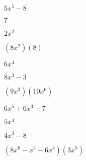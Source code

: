 \documentclass{article}
\begin{document}
\begin{multicols}{2}
 $5x^{5}-8$\item $7$\item $2x^2$\item $(8x^2)(8)$\item $6x^{4}$\item $8x^{3}-3$\item $(9x^{3})(10x^{6})$\item $6x^{5}+6x^{3}-7$\item $5x^{4}$\item $4x^{3}-8$\item $(8x^{6}-x^{5}-6x^{4})(3x^{5})$\
\end{multicols}
\end{document}
